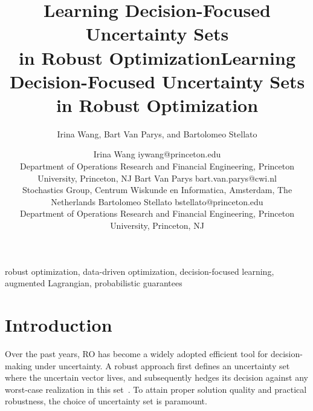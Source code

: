 \documentclass[11pt]{article}
\begin{document}
\ifpreprint
\title{Learning Decision-Focused Uncertainty Sets \\
in Robust Optimization}
\author{Irina Wang, Bart Van Parys, and Bartolomeo Stellato}
\maketitle
\begin{abstract}

\end{abstract}

\else


\title{Learning Decision-Focused Uncertainty Sets \\in Robust Optimization}

\author{\name Irina Wang \email iywang@princeton.edu \\
       \addr Department of Operations Research and Financial Engineering, Princeton University, Princeton, NJ
       \AND
       \name Bart Van Parys \email bart.van.parys@cwi.nl \\
       \addr Stochastics Group, Centrum Wiskunde en Informatica, Amsterdam, The Netherlands
       \AND
       \name Bartolomeo Stellato \email bstellato@princeton.edu \\
       \addr Department of Operations Research and Financial Engineering, Princeton University, Princeton, NJ}

\editor{ }

\maketitle

\begin{abstract}

\end{abstract}

\begin{keywords}
robust optimization, data-driven optimization, decision-focused learning, augmented Lagrangian, probabilistic guarantees
\end{keywords}

\fi

\section{Introduction}
\label{sec:intro_p}
\setlength{\parskip}{0pt}
Over the past years, \gls{RO} has become a widely adopted efficient tool for decision-making under uncertainty.
A robust approach first defines an uncertainty set where the uncertain vector lives, and subsequently hedges its decision against any worst-case realization in this set~\citep{robustconvexopt,ben-tal_robust_2009,bertsimassurvey,robustadaptopt}.
To attain proper solution quality and practical robustness, the choice of uncertainty set is paramount.  
\end{document}
